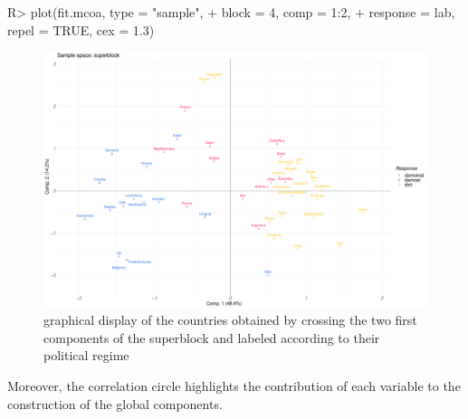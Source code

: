 \documentclass[
]{jss}
\begin{document}
\begin{CodeChunk}
\begin{CodeInput}
R> plot(fit.mcoa, type = "sample", 
+      block = 4, comp = 1:2, 
+      response = lab, repel = TRUE, cex = 1.3)
\end{CodeInput}
\begin{figure}

{\centering \includegraphics{RGCCA_files/figure-latex/unnamed-chunk-14-1} 

}

\caption[graphical display of the countries obtained by crossing the two first components of the superblock and labeled according to their political regime]{graphical display of the countries obtained by crossing the two first components of the superblock and labeled according to their political regime}\label{fig:unnamed-chunk-14}
\end{figure}
\end{CodeChunk}

\normalsize

Moreover, the correlation circle highlights the contribution of each
variable to the construction of the global components.

\footnotesize
\end{document}

